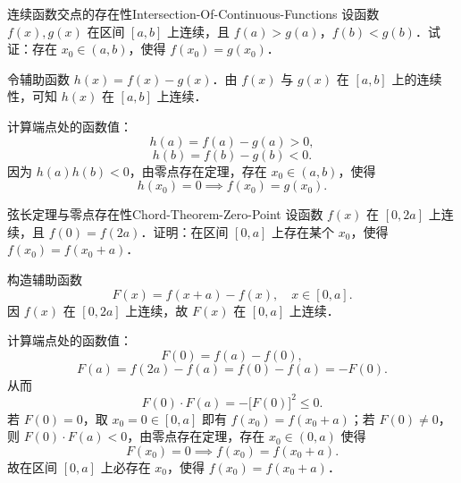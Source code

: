 \begin{problem}{连续函数交点的存在性}{Intersection-Of-Continuous-Functions}
    设函数 $f(x), g(x)$ 在区间 $[a, b]$ 上连续，且 $f(a) > g(a)$，$f(b) < g(b)$．试证：存在 $x_0 \in (a, b)$，使得 $f(x_0) = g(x_0)$．
\end{problem}

\begin{myproof}
    令辅助函数 $h(x) = f(x) - g(x)$．由 $f(x)$ 与 $g(x)$ 在 $[a, b]$ 上的连续性，可知 $h(x)$ 在 $[a, b]$ 上连续．

    计算端点处的函数值：
    \begin{equation}
        h(a) = f(a) - g(a) > 0,
    \end{equation}
    \begin{equation}
        h(b) = f(b) - g(b) < 0.
    \end{equation}
    因为 $h(a)h(b) < 0$，由零点存在定理，存在 $x_0 \in (a, b)$，使得
    \begin{equation}
        h(x_0) = 0 \implies f(x_0) = g(x_0).
    \end{equation}
\end{myproof}

\begin{problem}{弦长定理与零点存在性}{Chord-Theorem-Zero-Point}
    设函数 $f(x)$ 在 $[0, 2a]$ 上连续，且 $f(0) = f(2a)$．证明：在区间 $[0, a]$ 上存在某个 $x_0$，使得 $f(x_0) = f(x_0+a)$．
\end{problem}

\begin{myproof}
    构造辅助函数
    \begin{equation}
        F(x) = f(x+a) - f(x), \quad x \in [0, a].
    \end{equation}
    因 $f(x)$ 在 $[0, 2a]$ 上连续，故 $F(x)$ 在 $[0, a]$ 上连续．

    计算端点处的函数值：
    \begin{equation}
        F(0) = f(a) - f(0),
    \end{equation}
    \begin{equation}
        F(a) = f(2a) - f(a) = f(0) - f(a) = -F(0).
    \end{equation}
    从而
    \begin{equation}
        F(0) \cdot F(a) = -\bigl[ F(0) \bigr]^2 \leqslant 0.
    \end{equation}
    若 $F(0) = 0$，取 $x_0 = 0 \in [0, a]$ 即有 $f(x_0) = f(x_0 + a)$；若 $F(0) \neq 0$，则 $F(0) \cdot F(a) < 0$，由零点存在定理，存在 $x_0 \in (0, a)$ 使得
    \begin{equation}
        F(x_0) = 0 \implies f(x_0) = f(x_0 + a).
    \end{equation}
    故在区间 $[0, a]$ 上必存在 $x_0$，使得 $f(x_0) = f(x_0+a)$．
\end{myproof}


